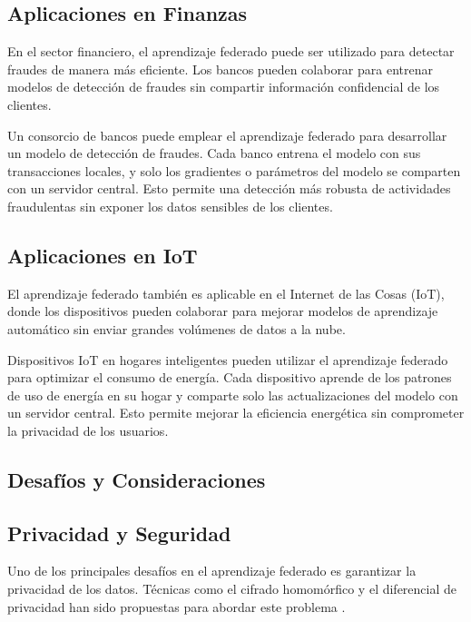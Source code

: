 \subsection{Aplicaciones en Finanzas}
En el sector financiero, el aprendizaje federado puede ser utilizado para detectar fraudes de manera más eficiente. Los bancos pueden colaborar para entrenar modelos de detección de fraudes sin compartir información confidencial de los clientes.

\begin{example}
	Un consorcio de bancos puede emplear el aprendizaje federado para desarrollar un modelo de detección de fraudes. Cada banco entrena el modelo con sus transacciones locales, y solo los gradientes o parámetros del modelo se comparten con un servidor central. Esto permite una detección más robusta de actividades fraudulentas sin exponer los datos sensibles de los clientes.
\end{example}

\subsection{Aplicaciones en IoT}
El aprendizaje federado también es aplicable en el Internet de las Cosas (IoT), donde los dispositivos pueden colaborar para mejorar modelos de aprendizaje automático sin enviar grandes volúmenes de datos a la nube.

\begin{example}
	Dispositivos IoT en hogares inteligentes pueden utilizar el aprendizaje federado para optimizar el consumo de energía. Cada dispositivo aprende de los patrones de uso de energía en su hogar y comparte solo las actualizaciones del modelo con un servidor central. Esto permite mejorar la eficiencia energética sin comprometer la privacidad de los usuarios.
\end{example}

\subsection{Desafíos y Consideraciones}

\subsection{Privacidad y Seguridad}
Uno de los principales desafíos en el aprendizaje federado es garantizar la privacidad de los datos. Técnicas como el cifrado homomórfico y el diferencial de privacidad han sido propuestas para abordar este problema \cite{dwork2014algorithmic}.

